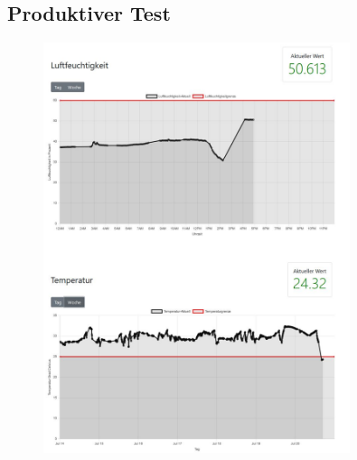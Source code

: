 \documentclass[conference]{IEEEtran}
\begin{document}
\begin{appendices}
\section{Produktiver Test}
\label{sec:testDiagramm}
\begin{figure}[h]
    \centering
    \includegraphics[width=0.8\textwidth]{fig/test.JPG}
\end{figure}

\end{appendices}
\end{document}
